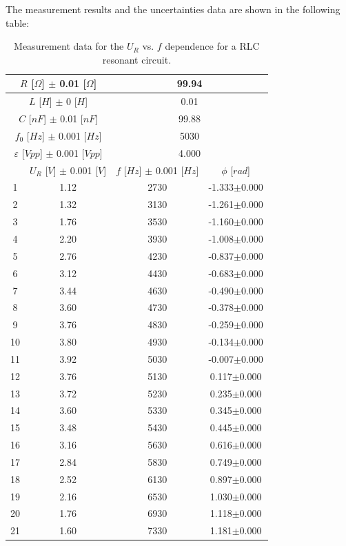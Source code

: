 \documentclass[12pt, a4paper]{article}
\begin{document}
The measurement results and the uncertainties data are shown in the following table:
\begin{table}[H]
	\centering
	\begin{tabular}{|c|c|c|c|}
	\hline
	\multicolumn{2}{|c|}{$R$ [$\Omega$] $\pm$ 0.01 [$\Omega$]}	&	\multicolumn{2}{|c|}{99.94}	\\
	\hline
	\multicolumn{2}{|c|}{$L$ [$H$] $\pm$ 0 [$H$]}	&	\multicolumn{2}{|c|}{0.01}	\\
	\hline
	\multicolumn{2}{|c|}{$C$ [$nF$] $\pm$ 0.01 [$nF$]}	&	\multicolumn{2}{|c|}{99.88}	\\
	\hline
	\multicolumn{2}{|c|}{$f_0$ [$Hz$] $\pm$ 0.001 [$Hz$]}	&	\multicolumn{2}{|c|}{5030}	\\
	\hline
	\multicolumn{2}{|c|}{$\varepsilon$ [$Vpp$] $\pm$ 0.001 [$Vpp$]}	&	\multicolumn{2}{|c|}{4.000}	\\
	\hline
	& $U_R$ [$V$] $\pm$ 0.001 [$V$] & $f$ [$Hz$] $\pm$ 0.001 [$Hz$] & $\phi$ [$rad$]\\
	\hline
	1  & 1.12 & 2730 & -1.333$\pm$0.000 \\ \hline
	2  & 1.32 & 3130 & -1.261$\pm$0.000 \\ \hline
	3  & 1.76 & 3530 & -1.160$\pm$0.000 \\ \hline
	4  & 2.20 & 3930 & -1.008$\pm$0.000 \\ \hline
	5  & 2.76 & 4230 & -0.837$\pm$0.000 \\ \hline
	6  & 3.12 & 4430 & -0.683$\pm$0.000 \\ \hline
	7  & 3.44 & 4630 & -0.490$\pm$0.000 \\ \hline
	8  & 3.60 & 4730 & -0.378$\pm$0.000 \\ \hline
	9  & 3.76 & 4830 & -0.259$\pm$0.000 \\ \hline
	10 & 3.80 & 4930 & -0.134$\pm$0.000 \\ \hline
	11 & 3.92 & 5030 & -0.007$\pm$0.000 \\ \hline
	12 & 3.76 & 5130 & 0.117$\pm$0.000  \\ \hline
	13 & 3.72 & 5230 & 0.235$\pm$0.000  \\ \hline
	14 & 3.60 & 5330 & 0.345$\pm$0.000  \\ \hline
	15 & 3.48 & 5430 & 0.445$\pm$0.000  \\ \hline
	16 & 3.16 & 5630 & 0.616$\pm$0.000  \\ \hline
	17 & 2.84 & 5830 & 0.749$\pm$0.000  \\ \hline
	18 & 2.52 & 6130 & 0.897$\pm$0.000  \\ \hline
	19 & 2.16 & 6530 & 1.030$\pm$0.000  \\ \hline
	20 & 1.76 & 6930 & 1.118$\pm$0.000  \\ \hline
	21 & 1.60 & 7330 & 1.181$\pm$0.000  \\ \hline
	\end{tabular}
	\caption{Measurement data for the $U_R$ vs. $f$ dependence for a RLC resonant circuit.}
	\label{tab-4}
	\end{table}
\end{document}
